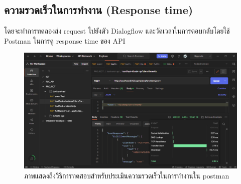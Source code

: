 \subsection{ความรวดเร็วในการทำงาน (Response time)}
โดยจะทำการทดลองส่ง request ไปยังตัว Dialogflow และวัดเวลาในการตอบกลับโดยใช้ Postman ในการดู response time ของ API

\begin{figure}[hbt!]
  \begin{center}
    \includegraphics[width=\textwidth,keepaspectratio]{pic/eval_bot_response_time.png}
  \end{center}
  \caption{ภาพแสดงถึงวิธีการทดสอบสำหรับประเมินความรวดเร็วในการทำงานใน postman}
  \label{fig:eval_bot_response_time}
\end{figure}

